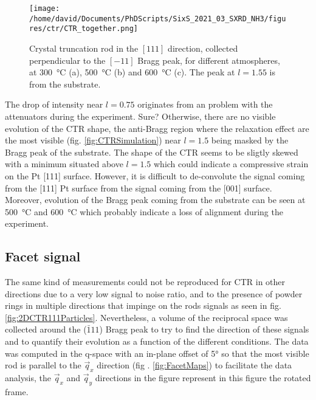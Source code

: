 \begin{figure}[!htb]
    \centering
    \texttt{[image: /home/david/Documents/PhDScripts/SixS\_2021\_03\_SXRD\_NH3/figures/ctr/CTR\_together.png]}
    \caption{
        Crystal truncation rod in the $[111]$ direction, collected perpendicular to the $[-11]$ Bragg peak, for different atmospheres, at \qty{300}{\degreeCelsius} (a), \qty{500}{\degreeCelsius} (b) and \qty{600}{\degreeCelsius} (c).
        The peak at $l=1.55$ is from the  substrate.
    }
    \label{fig:CTR111Particles}
\end{figure}

The drop of intensity near $l=0.75$ originates from an problem with the attenuators during the experiment.
\textcolor{Important}{Sure?}
Otherwise, there are no visible evolution of the CTR shape, the anti-Bragg region where the relaxation effect are the most visible (fig. \ref{fig:CTRSimulation}) near $l=1.5$ being masked by the Bragg peak of the substrate.
The shape of the CTR seems to be sligtly skewed with a minimum situated above $l=1.5$ which could indicate a compressive strain on the Pt [111] surface.
However, it is difficult to de-convolute the signal coming from the [111] Pt surface from the signal coming from the [001]  surface.
Moreover, evolution of the Bragg peak coming from the substrate can be seen at \qty{500}{\degreeCelsius} and \qty{600}{\degreeCelsius} which probably indicate a loss of alignment during the experiment.

\subsection{Facet signal}

The same kind of measurements could not be reproduced for CTR in other directions due to a very low signal to noise ratio, and to the presence of powder rings in multiple directions that impinge on the rods signals as seen in fig. \ref{fig:2DCTR111Particles}.
Nevertheless, a volume of the reciprocal space was collected around the ($\bar{1}11$) Bragg peak to try to find the direction of these signals and to quantify their evolution as a function of the different conditions.
The data was computed in the q-space with an in-plane offset of \ang{5} so that the most visible rod is parallel to the $\vec{q}_x$ direction (fig . \ref{fig:FacetMaps}) to facilitate the data analysis, the $\vec{q}_x$ and $\vec{q}_y$ directions in the figure represent in this figure the rotated frame.

